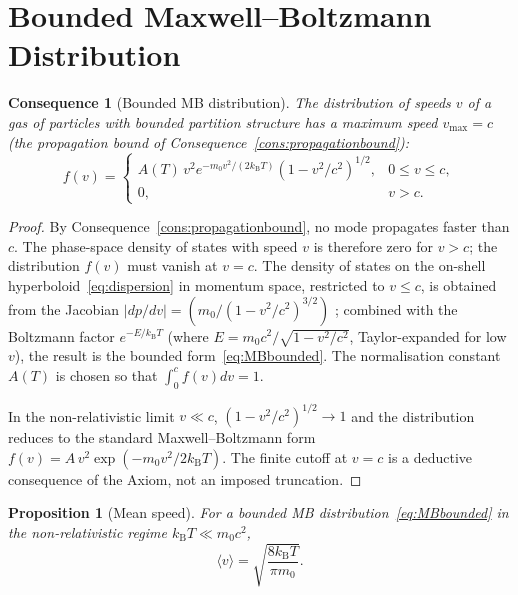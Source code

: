 \documentclass[11pt,twocolumn,a4paper]{article}
\theoremstyle{axiomstyle}
\theoremstyle{conseqstyle}
\newtheorem{consequence}{Consequence}
\newtheorem{proposition}{Proposition}
\theoremstyle{definition}
\theoremstyle{remark}
\newcommand{\kB}{k_{\mathrm{B}}}
\begin{document}
\section{Bounded Maxwell--Boltzmann Distribution}
\label{sec:MBbounded}

\begin{consequence}[Bounded MB distribution]
\label{cons:MBbounded}
The distribution of speeds $v$ of a gas of particles with bounded partition structure has a maximum speed $v_{\max}=c$ (the propagation bound of Consequence~\ref{cons:propagationbound}):
\begin{equation}
f(v)=\begin{cases}A(T)\,v^{2}e^{-m_{0}v^{2}/(2\kB T)}(1-v^{2}/c^{2})^{1/2},&0\le v\le c,\\0,&v>c.\end{cases}
\label{eq:MBbounded}
\end{equation}
\end{consequence}

\begin{proof}
By Consequence~\ref{cons:propagationbound}, no mode propagates faster than $c$. The phase-space density of states with speed $v$ is therefore zero for $v>c$; the distribution $f(v)$ must vanish at $v=c$. The density of states on the on-shell hyperboloid~\eqref{eq:dispersion} in momentum space, restricted to $v\le c$, is obtained from the Jacobian $|dp/dv|=(m_{0}/(1-v^{2}/c^{2})^{3/2})$ \citep{griffiths2018}; combined with the Boltzmann factor $e^{-E/\kB T}$ (where $E=m_{0}c^{2}/\sqrt{1-v^{2}/c^{2}}$, Taylor-expanded for low $v$), the result is the bounded form~\eqref{eq:MBbounded}. The normalisation constant $A(T)$ is chosen so that $\int_{0}^{c}f(v)dv=1$.

In the non-relativistic limit $v\ll c$, $(1-v^{2}/c^{2})^{1/2}\to 1$ and the distribution reduces to the standard Maxwell--Boltzmann form $f(v)=A\,v^{2}\exp(-m_{0}v^{2}/2\kB T)$. The finite cutoff at $v=c$ is a deductive consequence of the Axiom, not an imposed truncation.
\end{proof}

\begin{proposition}[Mean speed]
\label{prop:meanspeed}
For a bounded MB distribution~\eqref{eq:MBbounded} in the non-relativistic regime $\kB T\ll m_{0}c^{2}$,
\begin{equation}
\langle v\rangle=\sqrt{\frac{8\kB T}{\pi m_{0}}}.
\label{eq:meanspeed}
\end{equation}
\end{proposition}
\end{document}
